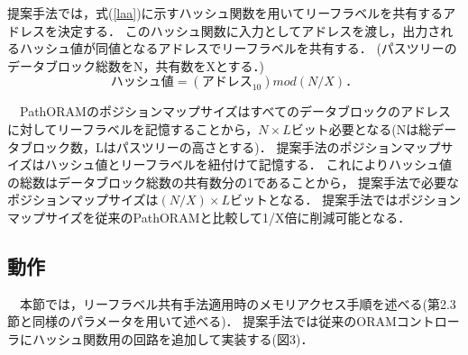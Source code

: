 \documentclass{jarticle}
\begin{document}
  提案手法では，式(\ref{laa})に示すハッシュ関数を用いてリーフラベルを共有するアドレスを決定する．
このハッシュ関数に入力としてアドレスを渡し，出力されるハッシュ値が同値となるアドレスでリーフラベルを共有する．
(パスツリーのデータブロック総数をN，共有数をXとする．)
\begin{equation}
  ハッシュ値=(アドレス_{10}) mod (N/X)．
  \label{laa}
\end{equation}

　PathORAMのポジションマップサイズはすべてのデータブロックのアドレスに対してリーフラベルを記憶することから，$N×L$ビット必要となる(Nは総データブロック数，Lはパスツリーの高さとする)．
提案手法のポジションマップサイズはハッシュ値とリーフラベルを紐付けて記憶する．
これによりハッシュ値の総数はデータブロック総数の共有数分の1であることから，
提案手法で必要なポジションマップサイズは$(N/X)×L$ビットとなる．
提案手法ではポジションマップサイズを従来のPathORAMと比較して1/X倍に削減可能となる．

\subsection{動作}
　本節では，リーフラベル共有手法適用時のメモリアクセス手順を述べる(第2.3節と同様のパラメータを用いて述べる)．
提案手法では従来のORAMコントローラにハッシュ関数用の回路を追加して実装する(図3)．
\end{document}
